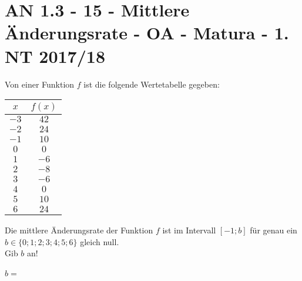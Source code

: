 \section{AN 1.3 - 15 - Mittlere Änderungsrate - OA - Matura - 1. NT 2017/18}

\begin{beispiel}[AN 1.3]{1}
Von einer Funktion $f$ ist die folgende Wertetabelle gegeben: 
\begin{center}
	\begin{tabular}{|c|c|}\hline
	\cellcolor[gray]{0.9}$x$&\cellcolor[gray]{0.9}$f(x)$\\ \hline
	$-3$&$42$\\ \hline
	$-2$&$24$\\ \hline
	$-1$&$10$\\ \hline
	$0$&$0$\\ \hline
	$1$&$-6$\\ \hline
	$2$&$-8$\\ \hline
	$3$&$-6$\\ \hline
	$4$&$0$\\ \hline
	$5$&$10$\\ \hline
	$6$&$24$\\ \hline
	\end{tabular}
\end{center}

Die mittlere Änderungsrate der Funktion $f$ ist im Intervall $[-1;b]$ für genau ein $b\in\{0; 1; 2; 3; 4; 5; 6\}$ gleich null.\\
Gib $b$ an!\leer

$b=$\,
\end{beispiel}